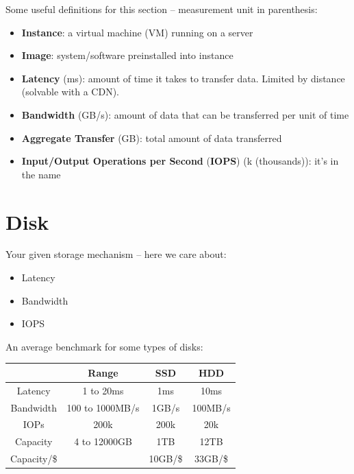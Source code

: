 \documentclass{report}
\newcommand{\npar}{\par\noindent}
\begin{document}
\par Some useful definitions for this section -- measurement unit in parenthesis:
\begin{itemize}
    \item \textbf{Instance}: a virtual machine (VM) running on a server
    \item \textbf{Image}: system/software preinstalled into instance
    \item \textbf{Latency} (ms): amount of time it takes to transfer data. Limited by distance (solvable with a CDN).
    \item \textbf{Bandwidth} (GB/s): amount of data that can be transferred per unit of time
    \item \textbf{Aggregate Transfer} (GB): total amount of data transferred
    \item \textbf{Input/Output Operations per Second} (\textbf{IOPS}) (k (thousands)): it's in the name
\end{itemize}

\section{Disk}

\par Your given storage mechanism -- here we care about:

\begin{itemize}
    \item Latency
    \item Bandwidth
    \item IOPS
\end{itemize}

\npar An average benchmark for some types of disks:

\begin{center}
    \begin{tabular}{ c | c | c | c }
                & Range             & SSD       & HDD \\ \hline
    Latency     & 1 to 20ms         & 1ms       & 10ms \\ 
    Bandwidth   & 100 to 1000MB/s   & 1GB/s     & 100MB/s \\  
    IOPs        & 200k              & 200k      & 20k \\
    Capacity    & 4 to 12000GB      & 1TB       & 12TB \\
    Capacity/\$ &                   & 10GB/\$   & 33GB/\$\\
    \end{tabular}
\end{center}
\end{document}

